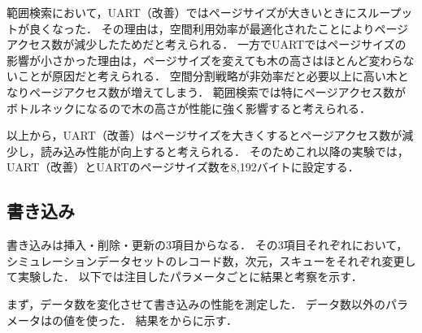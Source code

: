 範囲検索において，UART（改善）ではページサイズが大きいときにスループットが良くなった．
その理由は，空間利用効率が最適化されたことによりページアクセス数が減少したためだと考えられる．
一方でUARTではページサイズの影響が小さかった理由は，ページサイズを変えても木の高さはほとんど変わらないことが原因だと考えられる．
空間分割戦略が非効率だと必要以上に高い木となりページアクセス数が増えてしまう．
範囲検索では特にページアクセス数がボトルネックになるので木の高さが性能に強く影響すると考えられる．

以上から，UART（改善）はページサイズを大きくするとページアクセス数が減少し，読み込み性能が向上すると考えられる．
そのためこれ以降の実験では，UART（改善）とUARTのページサイズ数を8,192バイトに設定する．

\subsection{書き込み}

書き込みは挿入・削除・更新の3項目からなる．
その3項目それぞれにおいて，シミュレーションデータセットのレコード数，次元，スキューをそれぞれ変更して実験した．
以下では注目したパラメータごとに結果と考察を示す．

まず，データ数を変化させて書き込みの性能を測定した．
データ数以外のパラメータは\Tab{\ref{tab:rec}}の値を使った．
結果を\Fig{\ref{graph:rec-upd-2-0}}から\Fig{\ref{graph:rec-upd-8-0.5}}に示す．

